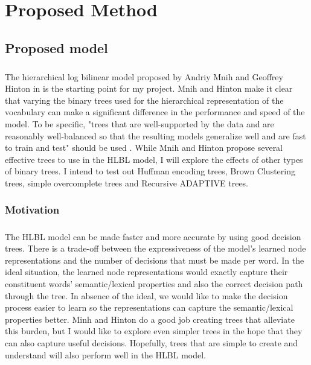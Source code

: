 

\chapter{Proposed Method}

\section{Proposed model} \label{sec:proposedModel}
\paragraph{}
The hierarchical log bilinear model proposed by Andriy Mnih and Geoffrey Hinton in \cite{MnihHinton2009} is the starting point for my project. Mnih and Hinton make it clear that varying the binary trees used for the hierarchical representation of the vocabulary can make a significant difference in the performance and speed of the model. To be specific, "trees
that are well-supported by the data and are reasonably well-balanced so that the resulting models
generalize well and are fast to train and test" should be used \cite[pg. 5]{MnihHinton2009}. While Mnih and Hinton propose several effective trees to use in the HLBL model, I will explore the effects of other types of binary trees. I intend to test out Huffman encoding trees, Brown Clustering trees, simple overcomplete trees and Recursive ADAPTIVE trees.
\subsection{Motivation}
\paragraph{}
The HLBL model can be made faster and more accurate by using good decision trees. There is a trade-off between the expressiveness of the model's learned node representations and the number of decisions that must be made per word. In the ideal situation, the learned node representations would exactly capture their constituent words' semantic/lexical properties and also the correct decision path through the tree. In absence of the ideal, we would like to make the decision process easier to learn so the representations can capture the semantic/lexical properties better. Minh and Hinton do a good job creating trees that alleviate this burden, but I would like to explore even simpler trees in the hope that they can also capture useful decisions. Hopefully, trees that are simple to create and understand will also perform well in the HLBL model. 

